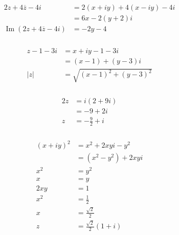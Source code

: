 \documentclass{article}
\renewcommand{\Im}{\operatorname{Im}}
\begin{document}
\begin{align*}
  2 z + 4 \overline{z} - 4 i       & = 2 (x + i y) + 4 (x - i y) - 4 i \\
                                   & = 6 x - 2 (y + 2) i               \\
  \Im (2 z + 4 \overline{z} - 4 i) & = -2 y - 4
\end{align*}

\setcounter{subsubsection}{30}
\subsubsection{}

\begin{align*}
  z - 1 - 3 i & = x + i y - 1 - 3 i            \\
              & = (x - 1) + (y - 3) i          \\
  |z|         & = \sqrt{(x - 1)^2 + (y - 3)^2}
\end{align*}

\setcounter{subsubsection}{32}
\subsubsection{}

\begin{align*}
  2 z & = i (2 + 9 i)      \\
      & = -9 + 2 i         \\
  z   & = -\frac{9}{2} + i
\end{align*}

\setcounter{subsubsection}{34}
\subsubsection{}

\begin{align*}
  (x + i y)^2 & = x^2 + 2 x y i - y^2        \\
              & = (x^2 - y^2) + 2 x y i      \\
  x^2         & = y^2                        \\
  x           & = y                          \\
  2 x y       & = 1                          \\
  x^2         & = \frac{1}{2}                \\
  x           & = \frac{\sqrt{2}}{2}         \\
  z           & = \frac{\sqrt{2}}{2} (1 + i)
\end{align*}
\end{document}
